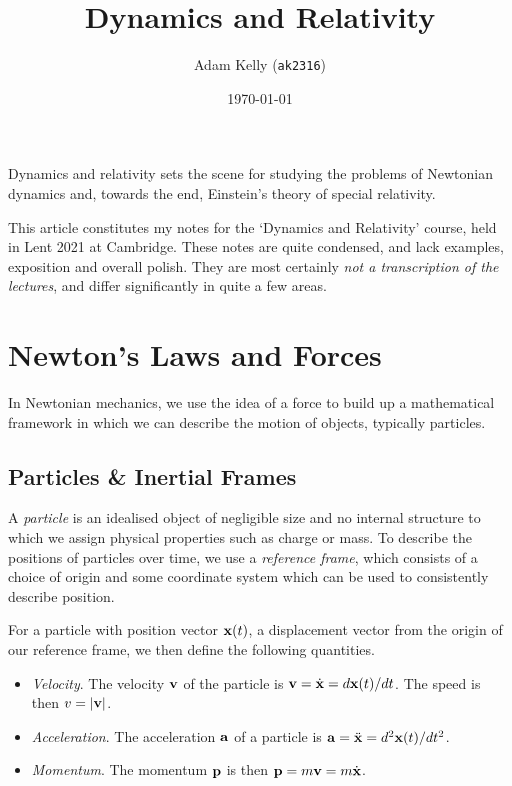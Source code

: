 \documentclass[a4paper]{scrartcl}
\title{Dynamics and Relativity}
\author{Adam Kelly (\texttt{ak2316})}
\date{\today}
\begin{document}
\maketitle  

Dynamics and relativity sets the scene for studying the problems of Newtonian dynamics and, towards the end, Einstein's theory of special relativity.

This article constitutes my notes for the `Dynamics and Relativity' course, held in Lent 2021 at Cambridge. These notes are quite condensed, and lack examples, exposition and overall polish. They are most certainly \emph{not a transcription of the lectures}, and differ significantly in quite a few areas.

\tableofcontents

\section{Newton's Laws and Forces}


In Newtonian mechanics, we use the idea of a force to build up a mathematical framework in which we can describe the motion of objects, typically particles.

\subsection{Particles \& Inertial Frames}

A \emph{particle} is an idealised object of negligible size and no internal structure to which we assign physical properties such as charge or mass.
To describe the positions of particles over time, we use a \emph{reference frame}, which consists of a choice of origin and some coordinate system which can be used to consistently describe position.

For a particle with position vector $\mathbf{x}(t)$, a displacement vector from the origin of our reference frame, we then define the following quantities.
\begin{itemize}
	\item \emph{Velocity}. The velocity $\mathbf{v}$ of the particle is $\mathbf{v} = \dot{\mathbf{x}} = d \mathbf{x}(t) / dt$. The speed is then $v = |\mathbf{v}|$.
	\item \emph{Acceleration}. The acceleration $\mathbf{a}$ of a particle is $\mathbf{a} = \ddot{\mathbf{x}} = d^2 \mathbf{x}(t)/dt^2$.
	\item \emph{Momentum}. The momentum $\mathbf{p}$ is then $\mathbf{p} = m \mathbf{v} = m \dot{\mathbf{x}}$.
\end{itemize}
\end{document}
